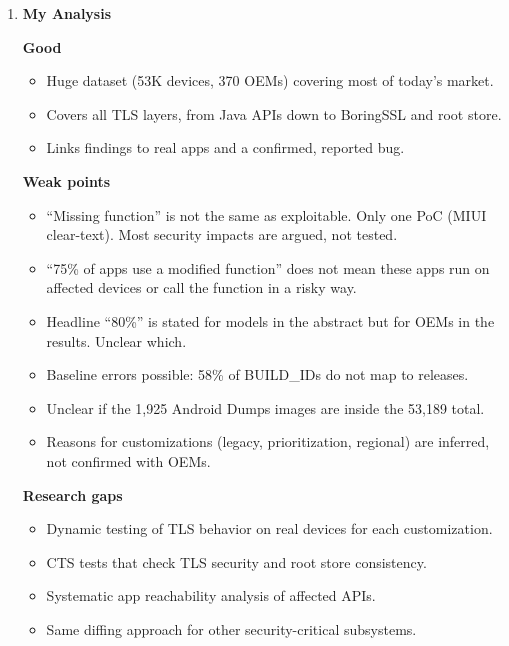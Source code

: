 \documentclass[11pt,a4paper]{article}
\newcommand{\entrypart}[1]{\textbf{\color{accent}#1}\par\vspace{2pt}}
\begin{document}
\begin{enumerate}
    \item \entrypart{My Analysis}

    \textbf{Good}
    \begin{itemize}
        \item Huge dataset (53K devices, 370 OEMs) covering most of today's market.
        \item Covers all TLS layers, from Java APIs down to BoringSSL and root store.
        \item Links findings to real apps and a confirmed, reported bug.
    \end{itemize}

    \vspace{4pt}
    \textbf{Weak points}
    \begin{itemize}
        \item ``Missing function'' is not the same as exploitable. Only one PoC (MIUI clear-text). Most security impacts are argued, not tested.
        \item ``75\% of apps use a modified function'' does not mean these apps run on affected devices or call the function in a risky way.
        \item Headline ``80\%'' is stated for models in the abstract but for OEMs in the results. Unclear which.
        \item Baseline errors possible: 58\% of BUILD\_IDs do not map to releases.
        \item Unclear if the 1,925 Android Dumps images are inside the 53,189 total.
        \item Reasons for customizations (legacy, prioritization, regional) are inferred, not confirmed with OEMs.
    \end{itemize}

    \vspace{4pt}
    \textbf{Research gaps}
    \begin{itemize}
        \item Dynamic testing of TLS behavior on real devices for each customization.
        \item CTS tests that check TLS security and root store consistency.
        \item Systematic app reachability analysis of affected APIs.
        \item Same diffing approach for other security-critical subsystems.
    \end{itemize}

\end{enumerate}
\end{document}

